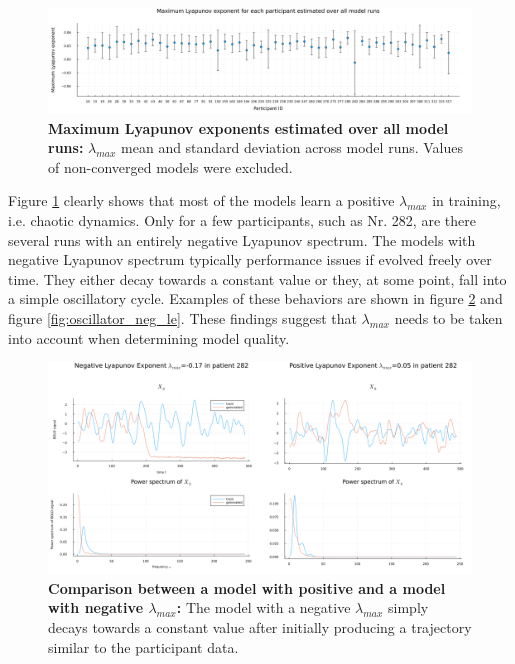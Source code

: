 \begin{figure}
    \includegraphics[width=\textwidth]{Images/max_le_of_patients.png}
    \caption[Maximum Lyapunov exponents estimated over all model runs]
    {\textbf{Maximum Lyapunov exponents estimated over all model runs: } $\lambda_{max}$ mean and standard deviation across model runs. Values of non-converged models were 
    excluded.}
    \label{fig:max_le_of_patients}
\end{figure}

Figure \ref{fig:max_le_of_patients} clearly shows that most of the models learn a positive $\lambda_{max}$ in training, i.e. chaotic dynamics. Only for a few participants, 
such as Nr. 282, are there several runs with an entirely negative Lyapunov spectrum. The models with negative Lyapunov spectrum typically performance issues if 
evolved freely over time. They either decay towards a constant value or they, at some point, fall into a simple oscillatory cycle. Examples of these behaviors are shown in 
figure \ref{fig:pos_neg_le_comparison} and figure \ref{fig:oscillator_neg_le}. These findings suggest that $\lambda_{max}$ needs to be taken into account when determining model 
quality. 

\begin{figure}
    \includegraphics[width=\textwidth]{Images/pos_neg_le_comparison.png}
    \caption[Comparison between a model with positive and a model with negative $\lambda_{max}$]
    {\textbf{Comparison between a model with positive and a model with negative $\lambda_{max}$: } The model with a negative $\lambda_{max}$ simply decays towards a constant 
    value after initially producing a trajectory similar to the participant data. }
    \label{fig:pos_neg_le_comparison}
\end{figure}

